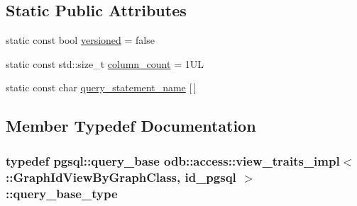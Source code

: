 \subsection*{Static Public Attributes}
\begin{DoxyCompactItemize}
\item 
static const bool \hyperlink{classodb_1_1access_1_1view__traits__impl_3_01_1_1_graph_id_view_by_graph_class_00_01id__pgsql_01_4_a6764b273ad57a6b485455207dce0e7a5}{versioned} = false
\item 
static const std\+::size\+\_\+t \hyperlink{classodb_1_1access_1_1view__traits__impl_3_01_1_1_graph_id_view_by_graph_class_00_01id__pgsql_01_4_ad19f01ecc447d7bf8aa089eb9da70314}{column\+\_\+count} = 1\+U\+L
\item 
static const char \hyperlink{classodb_1_1access_1_1view__traits__impl_3_01_1_1_graph_id_view_by_graph_class_00_01id__pgsql_01_4_ae65ddb8d0b7f63cec8382dac1e5b4cb7}{query\+\_\+statement\+\_\+name} \mbox{[}$\,$\mbox{]}
\end{DoxyCompactItemize}


\subsection{Member Typedef Documentation}
\hypertarget{classodb_1_1access_1_1view__traits__impl_3_01_1_1_graph_id_view_by_graph_class_00_01id__pgsql_01_4_aa1c36854b5d6bf476c817f80e0c3eeda}{}
\subsubsection[{query\+\_\+base\+\_\+type}]{\setlength{\rightskip}{0pt plus 5cm}typedef pgsql\+::query\+\_\+base odb\+::access\+::view\+\_\+traits\+\_\+impl$<$ \+::{\bf Graph\+Id\+View\+By\+Graph\+Class}, id\+\_\+pgsql $>$\+::{\bf query\+\_\+base\+\_\+type}}\label{classodb_1_1access_1_1view__traits__impl_3_01_1_1_graph_id_view_by_graph_class_00_01id__pgsql_01_4_aa1c36854b5d6bf476c817f80e0c3eeda}
\hypertarget{classodb_1_1access_1_1view__traits__impl_3_01_1_1_graph_id_view_by_graph_class_00_01id__pgsql_01_4_a5b03c778ac9c45ecf0aa73f7c0e597d6}{}
